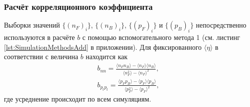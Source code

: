 \subsubsection{Расчёт корреляционного коэффициента}
Выборки значений $\{ (n_F)_i \}$, $\{ (n_B)_i \}$, $\{ (p_F)_i \}$ и $\{ (p_B)_i \}$ непосредственно используются в расчёте $b$ с помощью вспомогательного метода 1 (см. листинг \ref{lst:SimulationMethodsAdd} в приложении). Для фиксированного $\langle \eta \rangle$ в соответствии с \cite{bStatement} величина $b$ находится как 
\begin{equation} \label{eq:nfnb}
\begin{split}
	b_{nn} = \frac{\langle n_F n_B \rangle - \langle n_F \rangle \langle n_B \rangle}{\langle n_F^2 \rangle - \langle n_F \rangle^2}, \\
	b_{p_tp_t} = \frac{\langle p_F p_B \rangle - \langle p_F \rangle \langle p_B \rangle}{\langle p_F^2 \rangle - \langle p_F \rangle^2},
\end{split}
\end{equation}
где усреднение происходит по всем симуляциям. 

